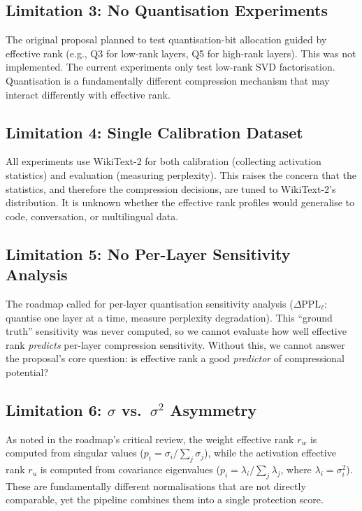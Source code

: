 \documentclass[11pt]{article}
\begin{document}
\subsection{Limitation 3: No Quantisation Experiments}

The original proposal planned to test quantisation-bit allocation guided by effective rank (e.g., Q3 for low-rank layers, Q5 for high-rank layers).  This was not implemented.  The current experiments only test low-rank SVD factorisation.  Quantisation is a fundamentally different compression mechanism that may interact differently with effective rank.

\subsection{Limitation 4: Single Calibration Dataset}

All experiments use WikiText-2 for both calibration (collecting activation statistics) and evaluation (measuring perplexity).  This raises the concern that the statistics, and therefore the compression decisions, are tuned to WikiText-2's distribution.  It is unknown whether the effective rank profiles would generalise to code, conversation, or multilingual data.

\subsection{Limitation 5: No Per-Layer Sensitivity Analysis}

The roadmap called for per-layer quantisation sensitivity analysis ($\Delta \text{PPL}_\ell$: quantise one layer at a time, measure perplexity degradation).  This ``ground truth'' sensitivity was never computed, so we cannot evaluate how well effective rank \emph{predicts} per-layer compression sensitivity.  Without this, we cannot answer the proposal's core question: is effective rank a good \emph{predictor} of compressional potential?

\subsection{Limitation 6: $\sigma$ vs.\ $\sigma^2$ Asymmetry}

As noted in the roadmap's critical review, the weight effective rank $r_w$ is computed from singular values ($p_i = \sigma_i / \sum_j \sigma_j$), while the activation effective rank $r_u$ is computed from covariance eigenvalues ($p_i = \lambda_i / \sum_j \lambda_j$, where $\lambda_i = \sigma_i^2$).  These are fundamentally different normalisations that are not directly comparable, yet the pipeline combines them into a single protection score.
\end{document}
